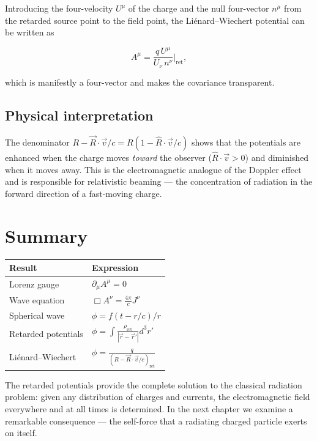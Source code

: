 Introducing the four-velocity $U^\mu$ of the charge and the null four-vector $n^\mu$ from the retarded source point to the field point, the Li\'enard--Wiechert potential can be written as

\begin{equation}
A^\mu = \frac{q\,U^\mu}{U_\nu\,n^\nu}\bigg|_{\text{ret}},
\end{equation}

which is manifestly a four-vector and makes the covariance transparent.

\subsection{Physical interpretation}

The denominator $R - \vec{R}\cdot\vec{v}/c = R(1 - \hat{R}\cdot\vec{v}/c)$ shows that the potentials are enhanced when the charge moves \emph{toward} the observer ($\hat{R}\cdot\vec{v} > 0$) and diminished when it moves away. This is the electromagnetic analogue of the Doppler effect and is responsible for relativistic beaming --- the concentration of radiation in the forward direction of a fast-moving charge.

\section{Summary}

\begin{table}[h]
\centering
\renewcommand{\arraystretch}{1.5}
\begin{tabular}{ll}
\toprule
\textbf{Result} & \textbf{Expression} \\
\midrule
Lorenz gauge & $\partial_\mu A^\mu = 0$ \\
Wave equation & $\Box A^\nu = \frac{4\pi}{c}J^\nu$ \\
Spherical wave & $\phi = f(t-r/c)/r$ \\
Retarded potentials & $\phi = \int\frac{\rho_{\text{ret}}}{|\vec{r}-\vec{r}'|}d^3r'$ \\
Li\'enard--Wiechert & $\phi = \frac{q}{(R - \vec{R}\cdot\vec{v}/c)_{\text{ret}}}$ \\
\bottomrule
\end{tabular}
\end{table}

The retarded potentials provide the complete solution to the classical radiation problem: given any distribution of charges and currents, the electromagnetic field everywhere and at all times is determined. In the next chapter we examine a remarkable consequence --- the self-force that a radiating charged particle exerts on itself.
